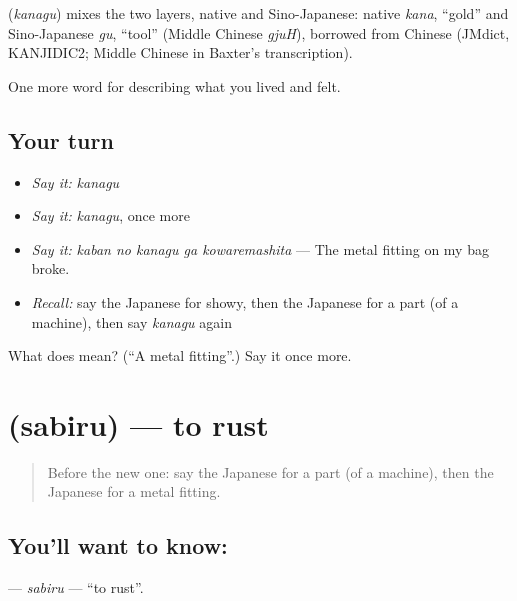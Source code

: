 \begin{cousinweb}
\textbf{} (\emph{kanagu}) mixes the two layers, native and Sino-Japanese: native \emph{kana}, \textquotedblleft{}gold\textquotedblright{} and Sino-Japanese \emph{gu}, \textquotedblleft{}tool\textquotedblright{} (Middle Chinese \emph{gjuH}), borrowed from Chinese (JMdict, KANJIDIC2; Middle Chinese in Baxter's transcription).
\end{cousinweb}

\begin{grammarlens}[title={What you've built}]
One more word for describing what you lived and felt.
\end{grammarlens}

\subsection*{Your turn}
\begin{itemize}
\raggedright
  \item \emph{Say it:} \emph{kanagu}
  \item \emph{Say it:} \emph{kanagu}, once more
  \item \emph{Say it:} \emph{kaban no kanagu ga kowaremashita} — The metal fitting on my bag broke.
  \item \emph{Recall:} say the Japanese for showy, then the Japanese for a part (of a machine), then say \emph{kanagu} again
\end{itemize}

\begin{tcolorbox}[breakable,colback=teal!4,colframe=teal!35!black,title={Before you move on}]
What does  mean? (\textquotedblleft{}A metal fitting\textquotedblright{}.) Say it once more.
\end{tcolorbox}
\section[\texorpdfstring{\ja{さびる} (sabiru)}{さびる (sabiru)}]{ (sabiru) — to rust}

\label{lesson:JA-C486-sabiru}



\begin{quote}
Before the new one: say the Japanese for a part (of a machine), then the Japanese for a metal fitting.
\end{quote}

\subsection*{You'll want to know: }
\textbf{} — \emph{sabiru} — \textquotedblleft{}to rust\textquotedblright{}.

